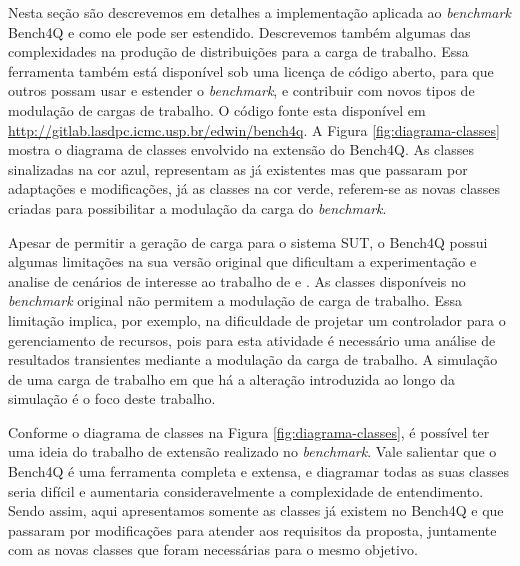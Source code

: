 Nesta seção são descrevemos em detalhes a implementação aplicada ao \textit{benchmark} Bench4Q e como ele pode ser estendido. Descrevemos também algumas das complexidades na produção de distribuições para a carga de trabalho. Essa ferramenta também está disponível sob uma licença de código aberto, para que outros possam usar e estender o \textit{benchmark}, e contribuir com novos tipos de modulação de cargas de trabalho. O código fonte esta disponível em \href{URL}{http://gitlab.lasdpc.icmc.usp.br/edwin/bench4q}. A Figura \ref{fig:diagrama-classes} mostra o diagrama de classes envolvido na extensão do Bench4Q. As classes sinalizadas na cor azul, representam as já existentes mas que passaram por adaptações e modificações, já as classes na cor verde, referem-se as novas classes criadas para possibilitar a modulação da carga do \textit{benchmark}.

Apesar de permitir a geração de carga para o sistema SUT, o Bench4Q possui algumas limitações na sua versão original que dificultam a experimentação e analise de cenários de interesse ao trabalho de  e .
As classes disponíveis no \textit{benchmark} original não permitem a modulação de carga de trabalho. Essa limitação implica, por exemplo, na dificuldade de projetar um controlador para o gerenciamento de recursos, pois para esta atividade é necessário uma análise de resultados transientes mediante a modulação da carga de trabalho. A simulação de uma carga de trabalho em que há a alteração introduzida ao longo da simulação é o foco deste trabalho.

Conforme o diagrama de classes na Figura \ref{fig:diagrama-classes}, é possível ter uma ideia do trabalho de extensão realizado no \textit{benchmark}. Vale  salientar que o Bench4Q é uma ferramenta completa e extensa, e diagramar todas as suas classes seria difícil e aumentaria consideravelmente a complexidade de entendimento. Sendo assim, aqui apresentamos somente as classes já existem no Bench4Q e que passaram por modificações para atender aos requisitos da proposta, juntamente com as novas classes que foram necessárias para o mesmo objetivo.
 

